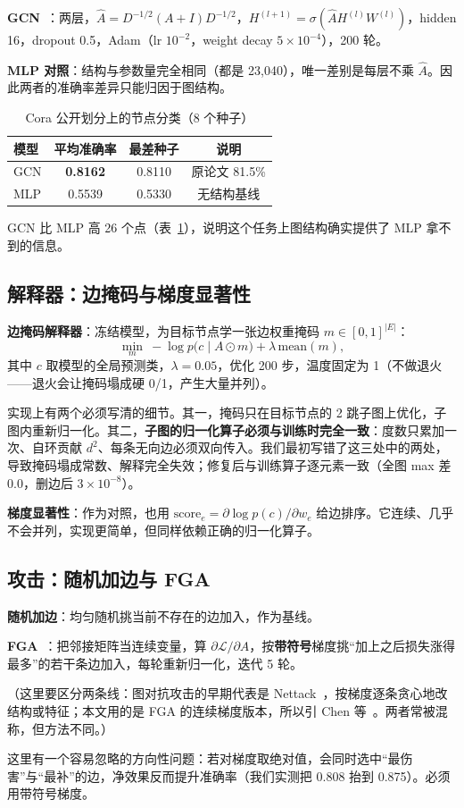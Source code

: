 \textbf{GCN}~\cite{kipf2017gcn}：两层，$\hat A=D^{-1/2}(A+I)D^{-1/2}$，$H^{(l+1)}=\sigma(\hat A H^{(l)}W^{(l)})$，hidden 16，dropout 0.5，Adam（lr $10^{-2}$，weight decay $5\times10^{-4}$），200 轮。

\textbf{MLP 对照}：结构与参数量完全相同（都是 23{,}040），唯一差别是每层不乘 $\hat A$。因此两者的准确率差异只能归因于图结构。

\begin{table}[H]
\centering
\caption{Cora 公开划分上的节点分类（8 个种子）}
\label{tab:cora}
\small
\begin{tabular}{lccc}
\toprule
模型 & 平均准确率 & 最差种子 & 说明 \\
\midrule
GCN & \textbf{0.8162} & 0.8110 & 原论文 81.5\% \\
MLP & 0.5539 & 0.5330 & 无结构基线 \\
\bottomrule
\end{tabular}
\end{table}

GCN 比 MLP 高 26 个点（表~\ref{tab:cora}），说明这个任务上图结构确实提供了 MLP 拿不到的信息。

\subsection{解释器：边掩码与梯度显著性}

\textbf{边掩码解释器}：冻结模型，为目标节点学一张边权重掩码 $m\in[0,1]^{|E|}$：
\begin{equation}
\min_m\ -\log p\bigl(c\mid A\odot m\bigr)+\lambda\,\mathrm{mean}(m),
\end{equation}
其中 $c$ 取模型的全局预测类，$\lambda=0.05$，优化 200 步，温度固定为 1（不做退火——退火会让掩码塌成硬 0/1，产生大量并列）。

实现上有两个必须写清的细节。其一，掩码只在目标节点的 2 跳子图上优化，子图内重新归一化。其二，\textbf{子图的归一化算子必须与训练时完全一致}：度数只累加一次、自环贡献 $d^2$、每条无向边必须双向传入。我们最初写错了这三处中的两处，导致掩码塌成常数、解释完全失效；修复后与训练算子逐元素一致（全图 max 差 $0.0$，删边后 $3\times10^{-8}$）。

\textbf{梯度显著性}：作为对照，也用 $\mathrm{score}_e=\partial\log p(c)/\partial w_e$ 给边排序。它连续、几乎不会并列，实现更简单，但同样依赖正确的归一化算子。

\subsection{攻击：随机加边与 FGA}

\textbf{随机加边}：均匀随机挑当前不存在的边加入，作为基线。

\textbf{FGA}~\cite{chen2018fga}：把邻接矩阵当连续变量，算 $\partial\mathcal L/\partial A$，按\textbf{带符号}梯度挑“加上之后损失涨得最多”的若干条边加入，每轮重新归一化，迭代 5 轮。

（这里要区分两条线：图对抗攻击的早期代表是 Nettack~\cite{zugner2018fga}，按梯度逐条贪心地改结构或特征；本文用的是 FGA 的连续梯度版本，所以引 Chen 等~\cite{chen2018fga}。两者常被混称，但方法不同。）

这里有一个容易忽略的方向性问题：若对梯度取绝对值，会同时选中“最伤害”与“最补”的边，净效果反而提升准确率（我们实测把 0.808 抬到 0.875）。必须用带符号梯度。

